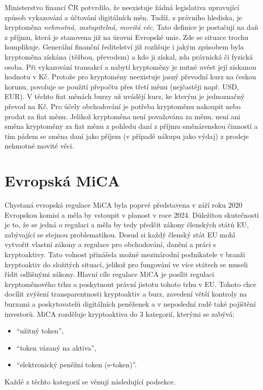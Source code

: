 Ministerstvo financí ČR potvrdilo, že neexistuje žádná legislativa upravující způsob vykazování a účtování digitálních měn. %
Tudíž, z právního hlediska, je kryptoměna \emph{nehmotná, zastupitelná, movitá věc}. Tato definice je postačují na daň z příjmu, která je stanovena již na úrovni Evropské unie.
Zde se situace trochu komplikuje. Generální finanční ředitelství již rozlišuje i jakým způsobem byla kryptoměna získána (těžbou, převodem) a kdo ji získal, zda právnická či fyzická osoba.
Při vykazování transakcí a nabytí kryptoměny je nutné uvést její získanou hodnotu v Kč. Protože pro kryptoměny neexistuje jasný převodní kurz na českou korunu, povoluje se použití přepočtu přes
třetí měnu (nejčastěji např. USD, EUR). V těchto fiat měnách burzy už uvádějí kurz, ke kterým je jednoznačný převod na Kč.   
Pro účely obchodování je potřeba kryptoměnu nakoupit nebo prodat za fiat měnu. Jelikož kryptoměna není považována za měnu, není ani směna kryptoměny za fiat měnu z pohledu
daní z příjmu směnárenskou činností a tím pádem se směna daní jako příjem (v případě nákupu jako výdaj) z prodeje nehmotné movité věci.

\section*{Evropská MiCA}
Chystaná evropská regulace MiCA byla poprvé představena v září roku 2020 Evropskou komisí a měla by vstoupit v planost v roce 2024. Důležitou skutečností je to, že se jedná o regulaci
a měla by tedy předčit zákony členských států EU, zabývající se stejnou problematikou. Dosud si každý členský stát EU mohl vytvořit vlastní zákony a regulace pro obchodování, danění
a práci s kryptoaktivy. Tato volnost přinášela možné mezinárodní podnikatele v branži kryptoaktiv do složitých situací, jelikož pro fungování ve více státech se museli řídit odlišnými
zákony. Hlavní cíle regulace MiCA je posílit regulaci kryptoměnového trhu a poskytnout právní jistotu tohoto trhu v EU. Tohoto chce docílit zvýšení transparentnosti kryptoaktiv a burz,
zavedení větší kontroly na burzami a poskytovatelů digitálních peněženek a v neposlední radě také pojištění investorů. 
MiCA rozděluje kryptoaktiva do 3 kategorií, kterými se zabývá:
\begin{itemize}
    \item \enquote{užitný token},
    \item \enquote{token vázaný na aktiva},
    \item \enquote{elektronický peněžní token (e-token)}.
\end{itemize}
Každé z těchto kategorií se věnují následující podsekce.


